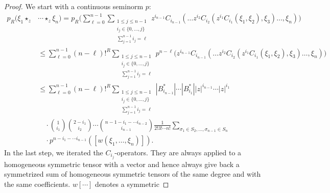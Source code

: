 \begin{proof}
    We start with a continuous seminorm $p$:
    \begin{align}
        \nonumber
        p_R \big(
            \xi_1 \star_z 
        &
            \cdots \star_z \xi_n
        \big)
        =
        p_R \Bigg(
        \sum\limits_{\ell = 0}^{n-1}
        \sum\limits_{\substack{
			1 \leq j \leq n-1 \\
			i_j \in \{0, \ldots, j\} \\
			\sum_{j = 1}^{n - 1} i_j = \ell
		}}
		z^{i_{n-1}}
		C_{i_{n-1}}
		\left(
			\ldots z^{i_2} C_{i_2}
			\left(
				z^{i_1} C_{i_1}
				\left( \xi_1, \xi_2 \right)
				, \xi_3
			\right)
			\ldots, \xi_n
		\right)
        \Bigg)
        \\
        \nonumber
        & \leq
        \sum\limits_{\ell = 0}^{n-1}
        (n - \ell)!^R
        \sum\limits_{\substack{
			1 \leq j \leq n-1 \\
			i_j \in \{0, \ldots, j\} \\
			\sum_{j = 1}^{n - 1} i_j = \ell
		}}
        p^{n - \ell} \Big(
		z^{i_{n-1}}
		C_{i_{n-1}}
		\left(
			\ldots z^{i_2} C_{i_2}
			\left(
				z^{i_1} C_{i_1}
				\left( \xi_1, \xi_2 \right)
				, \xi_3
			\right)
			\ldots, \xi_n
		\right)
		\Big)
        \\
        \nonumber
        & \leq
        \sum\limits_{\ell = 0}^{n-1}
        (n - \ell)!^R
        \sum\limits_{\substack{
			1 \leq j \leq n-1 \\
			i_j \in \{0, \ldots, j\} \\
			\sum_{j = 1}^{n - 1} i_j = \ell
		}}
        |B_{i_{n-1}}^*| \cdots |B_{i_1}^*|
        |z|^{i_{n-1}} \cdots |z|^{i_1}
        \\
        \nonumber
        & \quad \cdot
        \binom{1}{i_1} \binom{2 - i_1}{i_2}
        \cdots
        \binom{n - 1 - i_1 - \cdots i_{n-2}}{i_{n-1}}
        \frac{1}{2! 3 ! \cdots n!}
        \sum\limits_{\sigma_1 \in S_2, \ldots, \sigma_{n-1} \in S_n}
        \\
        & \quad \cdot
        \label{LCAna:PreContinuityIntermediateN}
        p^{n - i_1 - \cdots i_{n-1}}
        \left( 
         	\left[ w\left( \xi_1, \ldots, \xi_n \right) \right] 
        	\right).
    \end{align}
    In the last step, we iterated the $C_{i_j}$-operators. They are always 
    applied to a homogeneous symmetric tensor with a vector and hence always 
    give back a symmetrized sum of homogeneous symmetric tensors of the same 
    degree and with the same coefficients. $w[\cdots]$ denotes a symmetric 

\end{proof}
